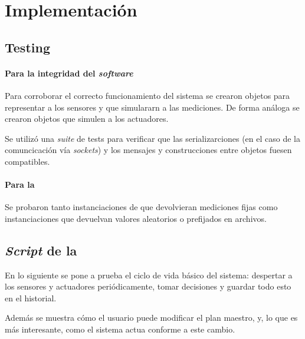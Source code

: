 \section{Implementaci\'on}
    \subsection{Testing}
      \paragraph{Para la integridad del \textit{software}}

        Para corroborar el correcto funcionamiento del sistema se crearon objetos para
        representar a los sensores y que simulararn a las mediciones.
        De forma an\'aloga se crearon objetos que simulen a los actuadores.
        
        Se utiliz\'o una \textit{suite} de tests para verificar que las
        serializarciones (en el caso de la comuncicaci\'on v\'ia \textit{sockets})
        y los mensajes y construcciones entre objetos fuesen compatibles.

      \paragraph{Para la \demostracion{}}
        Se probaron tanto instanciaciones de \arduino{} que devolvieran mediciones
        fijas como instanciaciones que devuelvan valores aleatorios o prefijados
        en archivos.
    \subsection{\textit{Script} de la \demostracion{}}

      En lo siguiente se pone a prueba el ciclo de vida b\'asico del sistema:
      despertar a los sensores y actuadores peri\'odicamente, tomar decisiones
      y guardar todo esto en el historial.

      Adem\'as se muestra c\'omo el usuario puede modificar el plan maestro, y,
      lo que es m\'as interesante, como el sistema actua conforme a este cambio.

